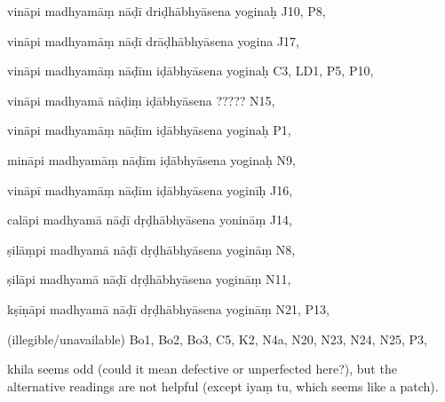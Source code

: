 \begin{marma}[hp03_127]
\item[vināpi madhyamāṃ nāḍī driḍhābhyāsena yoginaḥ] J10, P8, 
\item[vināpi madhyamāṃ nāḍī drāḍhābhyāsena yogina] J17,
\item[vināpi madhyamāṃ nāḍīm iḍābhyāsena yoginaḥ] C3, LD1, P5, P10,  
\item[vināpi madhyamā nāḍiṃ iḍābhyāsena ?????] N15,
\item[vināpi madhyamāṃ nāḍīm iḍābhyāsena yoginaḥ] P1,
\item[mināpi madhyamāṃ nāḍīm iḍābhyāsena yoginaḥ] N9,
\item[vināpī madhyamāṃ nāḍīm iḍābhyāsena yoginīḥ] J16,
\item[calāpi madhyamā nāḍī dṛḍhābhyāsena yonināṃ] J14,
\item[ṣilāṃpi madhyamā nāḍī dṛḍhābhyāsena yogināṃ] N8,
\item[ṣilāpi madhyamā nāḍī dṛḍhābhyāsena yogināṃ] N11,
\item[kṣīṇāpi madhyamā nāḍī dṛḍhābhyāsena yogināṃ] N21, P13, 
\item[(illegible/unavailable)] Bo1, Bo2, Bo3, C5, K2, N4a, N20, N23, N24, N25, P3,

  \begin{description}
    khila seems odd (could it mean defective or unperfected here?), but the alternative readings are not helpful (except iyaṃ tu, which seems like a patch).
  \end{description}

\end{marma}

